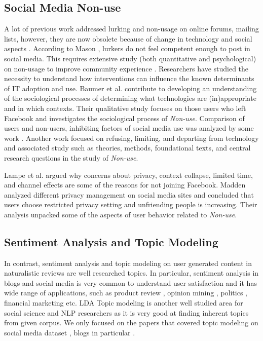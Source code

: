 \subsection{Social Media Non-use}
A lot of previous work addressed lurking and non-usage \cite{ames2013managing, crawford2009following, portwood2013media} on online forums, mailing lists, however, they are now obsolete because of change in technology and social aspects \cite{nonnecke2001lurkers}. According to Mason \cite{mason1999issues}, lurkers do not feel competent enough to post in social media. This requires extensive study (both quantitative and psychological) on non-usage to improve community experience \cite{preece2004top, schultz2004lurkers}.  Researchers have studied the necessity to understand how interventions can influence the known determinants of IT adoption and use. Baumer et al. \cite{baumer2013limiting} contribute to developing an understanding of the
sociological processes of determining what technologies are
(in)appropriate and in which contexts. Their qualitative study focuses on those users who left Facebook and investigates the sociological process of \textit{Non-use}. Comparison of users and non-users, inhibiting factors of social media use was analyzed by some work \cite{hargittai2007whose, ryan2011uses,warschauer2004technology}. Another work \cite{baumer2014refusing} focused on refusing, limiting, and departing from technology and associated study such as theories, methods, foundational texts, and central research questions in the study of \textit{Non-use}. 

Lampe et al. \cite{lampe2013users} argued why concerns about privacy, context collapse, limited time, and channel effects are some of the reasons for not joining Facebook. Madden \cite{madden2012privacy} analyzed different privacy management on social media sites and concluded that users choose restricted privacy setting and unfriending people is increasing. Their analysis unpacked some of the aspects of user behavior related to \textit{Non-use}. 


\subsection{Sentiment Analysis and Topic Modeling}
In contrast, sentiment analysis and topic modeling on user generated content in naturalistic reviews are well researched topics. In particular, sentiment analysis in blogs \cite{godbole2007large} and social media \cite{kouloumpis2011twitter, mohammad2013nrc, pak2010twitter} is very common to understand user satisfaction and it has wide range of applications, such as product review \cite{cui2006comparative, dang2010lexicon, isah2014social,   mukherjee2012feature}, opinion mining \cite{liu2012sentiment,pang2008opinion}, politics \cite{mullen2006preliminary}, financial marketing \cite{cambria2013new} etc. LDA Topic modeling is another well studied area for social science and NLP researchers as it is very good at finding inherent topics from given corpus. We only focused on the papers that covered topic modeling on social media dataset \cite{hu2013spatial, wang2012tm}, blogs in particular \cite{paul2009cross, yano2009predicting}. 

